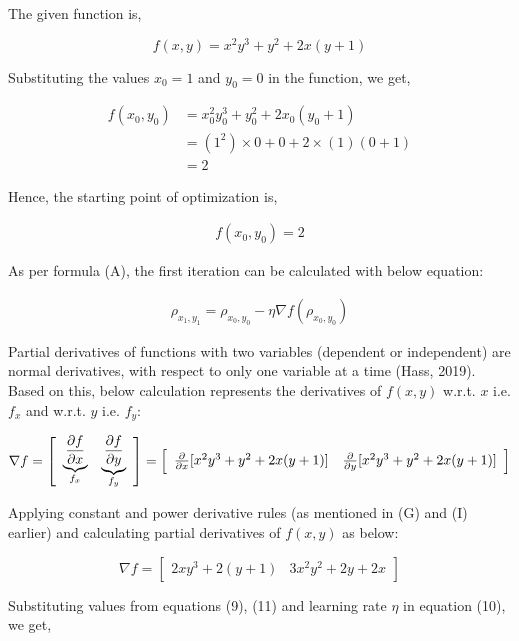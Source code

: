 \documentclass[a4paper]{report}
\begin{document}
The given function is,

$$f(x,y)=x^2 y^3+y^2+2x(y+1)$$

Substituting the values $x_0=1$ and $y_0=0$ in the function, we get,

\begin{align*}
    f(x_0,y_0)&= x_0^2 y_0^3+y_0^2+2x_0(y_0+1) \\
    &= (1^2)\times 0+0+2\times(1) (0+1) \\
    &= 2
\end{align*}


Hence, the starting point of optimization is,

\begin{align}
    f(x_0,y_0) =2
\end{align}

As per formula (A), the first iteration can be calculated with below equation:

\begin{align}
    \rho_{x_1,y_1} = \rho_{x_0,y_0} - \eta \nabla f(\rho_{x_0,y_0})
\end{align}

Partial derivatives of functions with two variables (dependent or independent) are normal derivatives, with respect to only one variable at a time (Hass, 2019). 
\newline Based on this, below calculation represents the derivatives of $f(x,y)$ w.r.t. $x$ i.e. $f_x$ and w.r.t. $y$ i.e. $f_y$:

$$\nabla f =
\left [\begin{array}{cc}
    \underbrace{\frac{\partial{f}}{\partial{x}}}_{\text{{$f_x$}}} & \underbrace{\frac{\partial{f}}{\partial{y}}}_{\textbf{{$f_y$}}}
\end{array}\right] = \left [\begin{array} {cc}
    \frac{\partial{}}{\partial{x}}[x^2 y^3+y^2+2x(y+1)] & \frac{\partial{}}{\partial{y}}[x^2 y^3+y^2+2x(y+1)]
\end{array}\right] $$


Applying constant and power derivative rules (as mentioned in (G) and (I) earlier) and calculating partial derivatives of $f(x,y)$ as below:


\begin{equation} \nabla f =
\begin{bmatrix}
     2xy^3+2(y+1) & 3x^2y^2+2y+2x
\end{bmatrix}
\end{equation}


Substituting values from equations (9), (11) and learning rate $\eta$ in equation (10), we get,
\end{document}
